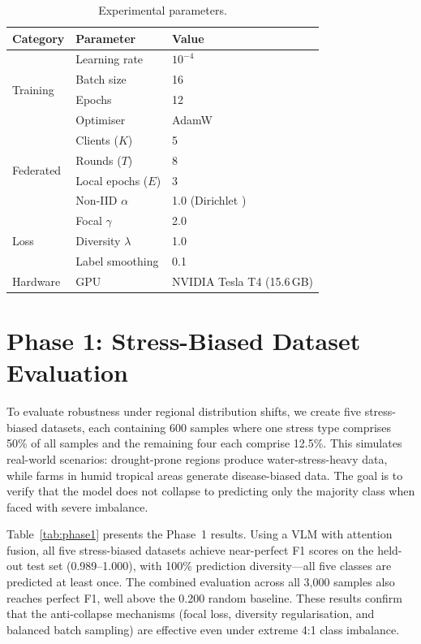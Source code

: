 \documentclass[12pt, a4paper, oneside]{Thesis}
\begin{document}
\begin{table}[htbp]\centering
\small
\begin{tabular}{llp{5cm}}
\toprule
\textbf{Category} & \textbf{Parameter} & \textbf{Value}\\
\midrule
\multirow{4}{*}{Training}
  & Learning rate & $10^{-4}$ \\
  & Batch size    & 16 \\
  & Epochs        & 12 \\
  & Optimiser     & AdamW \cite{Loshchilov2019} \\
\midrule
\multirow{4}{*}{Federated}
  & Clients ($K$)      & 5 \\
  & Rounds ($T$)       & 8 \\
  & Local epochs ($E$) & 3 \\
  & Non-IID $\alpha$   & 1.0 (Dirichlet \cite{Hsu2019}) \\
\midrule
\multirow{3}{*}{Loss}
  & Focal $\gamma$     & 2.0 \\
  & Diversity $\lambda$& 1.0 \\
  & Label smoothing    & 0.1 \\
\midrule
Hardware & GPU & NVIDIA Tesla T4 (15.6\,GB)\\
\bottomrule
\end{tabular}
\caption{Experimental parameters.}
\label{tab:expsetup}
\end{table}

\section{Phase 1: Stress-Biased Dataset Evaluation}

To evaluate robustness under regional distribution shifts, we create five stress-biased datasets, each containing 600 samples where one stress type comprises 50\% of all samples and the remaining four each comprise 12.5\%. This simulates real-world scenarios: drought-prone regions produce water-stress-heavy data, while farms in humid tropical areas generate disease-biased data. The goal is to verify that the model does not collapse to predicting only the majority class when faced with severe imbalance.

Table~\ref{tab:phase1} presents the Phase~1 results. Using a VLM with attention fusion, all five stress-biased datasets achieve near-perfect F1 scores on the held-out test set (0.989--1.000), with 100\% prediction diversity---all five classes are predicted at least once. The combined evaluation across all 3,000 samples also reaches perfect F1, well above the 0.200 random baseline. These results confirm that the anti-collapse mechanisms (focal loss, diversity regularisation, and balanced batch sampling) are effective even under extreme 4:1 class imbalance.
\end{document}
